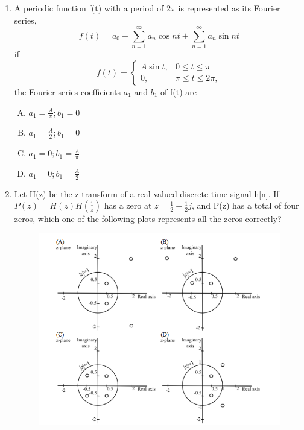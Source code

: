 \documentclass[journal,12pt,twocolumn]{IEEEtran}
\begin{document}
\begin{enumerate}
\item A periodic function f(t) with a period of $2\pi$ is represented as its Fourier series, 
\begin{equation}
    f(t)=a_0+\sum _{n=1 }^{\infty }a_n\cos nt+\sum _{n=1 }^{\infty }a_n\sin nt
\end{equation}
if
\[
	f(t)=\begin{cases}
		A\sin t, &  {0\leq t \leq \pi}  \\
		0, &   \pi \leq t \leq 2\pi ,
	\end{cases}
\] 
the Fourier series coefficients $a_1$ and $b_1$ of f(t) are-
\begin{enumerate}[(A)]

\setlength\itemsep{0.5em}

\item $ a_1=\frac{A}{\pi}; b_1=0$
\item $ a_1=\frac{A}{2}; b_1=0$

\item $ a_1=0; b_1=\frac{A}{\pi}$

\item $ a_1=0; b_1=\frac{A}{2}$

\end{enumerate}

\item  Let H(z) be the z-transform of a real-valued discrete-time signal h[n]. If $P(z)=H(z)H(\frac{1}{z})$ has a zero at $z=\frac{1}{2}+\frac{1}{2}j$, and P(z) has a total of four zeros, which one of the following plots represents all the zeros correctly?

\begin{figure}[!ht]
\begin{center}
\includegraphics[width=1.2\columnwidth]{./EC_1}
\end{center}
\label{fig:EC_1}	
\end{figure}


\end{enumerate}
\end{document}
